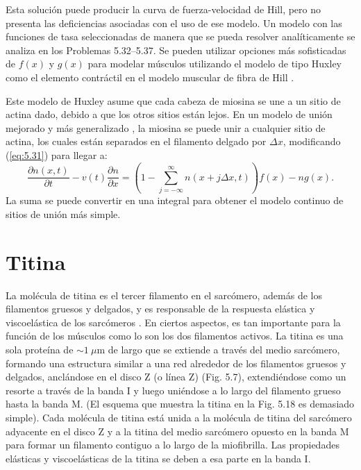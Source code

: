\documentclass[12pt]{book}
\begin{document}
Esta solución puede producir la curva de fuerza-velocidad de Hill, pero no presenta las deficiencias asociadas con el uso de ese modelo. Un modelo con las funciones de tasa seleccionadas de manera que se pueda resolver analíticamente se analiza en los Problemas 5.32--5.37. Se pueden utilizar opciones más sofisticadas de $f(x)$ y $g(x)$ para modelar músculos utilizando el modelo de tipo Huxley como el elemento contráctil en el modelo muscular de fibra de Hill \cite{41}.

Este modelo de Huxley asume que cada cabeza de miosina se une a un sitio de actina dado, debido a que los otros sitios están lejos. En un modelo de unión mejorado y más generalizado \cite{41}, la miosina se puede unir a cualquier sitio de actina, los cuales están separados en el filamento delgado por $\Delta x$, modificando (\ref{eq:5.31}) para llegar a:
\begin{equation}
\frac{\partial n(x, t)}{\partial t} - v(t) \frac{\partial n}{\partial x} = \left( 1 - \sum_{j=-\infty}^{\infty} n(x + j \Delta x, t) \right) f(x) - n g(x).
\label{eq:5.35}
\end{equation}
La suma se puede convertir en una integral para obtener el modelo continuo de sitios de unión más simple.

\section{Titina}

La molécula de titina es el tercer filamento en el sarcómero, además de los filamentos gruesos y delgados, y es responsable de la respuesta elástica y viscoelástica de los sarcómeros \cite{44, 45, 46, 49, 56}. En ciertos aspectos, es tan importante para la función de los músculos como lo son los dos filamentos activos. La titina es una sola proteína de $\sim 1\ \mu\text{m}$ de largo que se extiende a través del medio sarcómero, formando una estructura similar a una red alrededor de los filamentos gruesos y delgados, anclándose en el disco Z (o línea Z) (Fig. 5.7), extendiéndose como un resorte a través de la banda I y luego uniéndose a lo largo del filamento grueso hasta la banda M. (El esquema que muestra la titina en la Fig. 5.18 es demasiado simple). Cada molécula de titina está unida a la molécula de titina del sarcómero adyacente en el disco Z y a la titina del medio sarcómero opuesto en la banda M para formar un filamento contiguo a lo largo de la miofibrilla. Las propiedades elásticas y viscoelásticas de la titina se deben a esa parte en la banda I.
\end{document}
